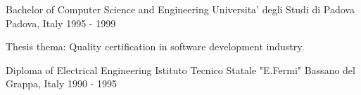

\begin{cventries}

\cventry
  {Bachelor of Computer Science and Engineering} %
  {Universita' degli Studi di Padova} %
  {Padova, Italy} %
  {1995 - 1999} %
  {
    \begin{cvitems} %
      \item {Thesis thema: Quality certification in software development industry. }
    \end{cvitems}
  }

\cventry
  {Diploma of Electrical Engineering} %
  {Istituto Tecnico Statale "E.Fermi"} %
  {Bassano del Grappa, Italy} %
  {1990 - 1995} %
  {}

\end{cventries}
